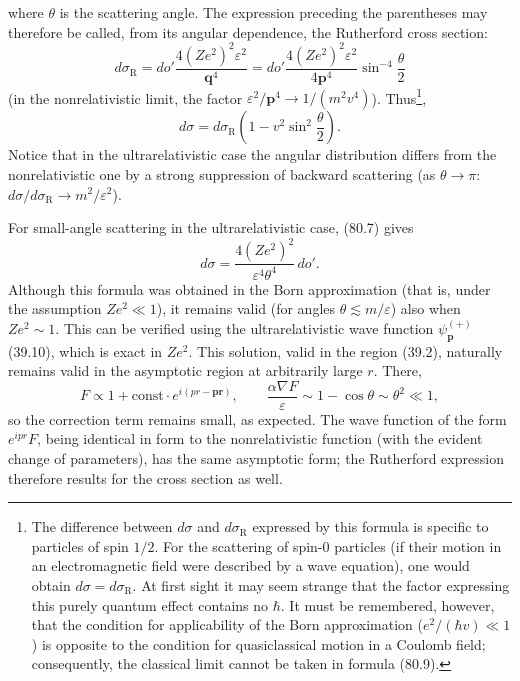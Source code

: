 where $\theta$ is the scattering angle. The expression preceding the parentheses may therefore be called, from its angular dependence, the Rutherford cross section:
\begin{equation}
d\sigma_{\mathrm R}=do'\frac{4(Ze^2)^2\varepsilon^2}{\mathbf q^4}
=do'\frac{4(Ze^2)^2\varepsilon^2}{4\mathbf p^4}\sin^{-4}\frac{\theta}{2}
\tag{80.8}
\end{equation}
(in the nonrelativistic limit, the factor $\varepsilon^2/\mathbf p^4\to1/(m^2v^4)$). Thus\footnote{The difference between $d\sigma$ and $d\sigma_{\mathrm R}$ expressed by this formula is specific to particles of spin $1/2$. For the scattering of spin-0 particles (if their motion in an electromagnetic field were described by a wave equation), one would obtain $d\sigma=d\sigma_{\mathrm R}$. At first sight it may seem strange that the factor expressing this purely quantum effect contains no $\hbar$. It must be remembered, however, that the condition for applicability of the Born approximation ($e^2/(\hbar v)\ll1$) is opposite to the condition for quasiclassical motion in a Coulomb field; consequently, the classical limit cannot be taken in formula (80.9).},
\begin{equation}
d\sigma=d\sigma_{\mathrm R}\left(1-v^2\sin^2\frac{\theta}{2}\right).
\tag{80.9}
\end{equation}
Notice that in the ultrarelativistic case the angular distribution differs from the nonrelativistic one by a strong suppression of backward scattering (as $\theta\to\pi$: $d\sigma/d\sigma_{\mathrm R}\to m^2/\varepsilon^2$).

For small-angle scattering in the ultrarelativistic case, (80.7) gives
\begin{equation}
d\sigma=\frac{4(Ze^2)^2}{\varepsilon^4\theta^4}\,do'.
\tag{80.10}
\end{equation}
Although this formula was obtained in the Born approximation (that is, under the assumption $Ze^2\ll1$), it remains valid (for angles $\theta\lesssim m/\varepsilon$) also when $Ze^2\sim1$. This can be verified using the ultrarelativistic wave function $\psi_{\mathbf p}^{(+)}$ (39.10), which is exact in $Ze^2$. This solution, valid in the region (39.2), naturally remains valid in the asymptotic region at arbitrarily large $r$. There,
\[
F\propto1+\text{const}\cdot e^{i(pr-\mathbf p\mathbf r)},
\qquad
\frac{\alpha\nabla F}{\varepsilon}\sim1-\cos\theta\sim\theta^2\ll1,
\]
so the correction term remains small, as expected. The wave function of the form $e^{ipr}F$, being identical in form to the nonrelativistic function (with the evident change of parameters), has the same asymptotic form; the Rutherford expression therefore results for the cross section as well.

